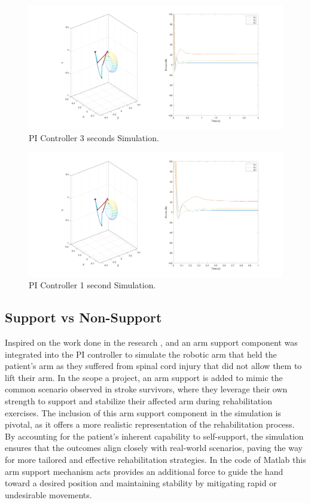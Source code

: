 \begin{figure}[h!]
    \centering

   \includegraphics[width=0.7\linewidth]{Pictures/Results/3s_NoNeuralExcitation.png}
    \caption{PI Controller 3 seconds Simulation.}
\end{figure}

\begin{figure}[h!]    
    \centering
    \includegraphics[width=0.7\linewidth]{Pictures/Results/1s_NoNeuralExcitation.png}
    \caption{PI Controller 1 second Simulation.}
\end{figure}


\newpage
\subsection{Support vs Non-Support}

Inspired on the work done in the research \cite{HSAC},\cite{QSC} and \cite{RTS} an arm support component was integrated into the PI controller to simulate the robotic arm that held the patient's arm as they suffered from spinal cord injury that did not allow them to lift their arm. In the scope a project, an arm support is added to mimic the common scenario observed in stroke survivors, where they leverage their own strength to support and stabilize their affected arm during rehabilitation exercises. The inclusion of this arm support component in the simulation is pivotal, as it offers a more realistic representation of the rehabilitation process. By accounting for the patient's inherent capability to self-support, the simulation ensures that the outcomes align closely with real-world scenarios, paving the way for more tailored and effective rehabilitation strategies. In the code of Matlab this arm support mechanism acts provides an additional force to guide the hand toward a desired position and maintaining stability by mitigating rapid or undesirable movements. 

